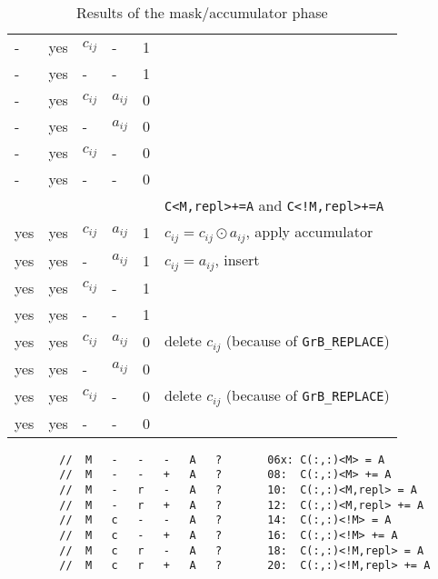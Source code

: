 \documentclass[12pt]{article}
\begin{document}
\begin{table}
{\begin{tabular}{lllll|l}
    -  &yes & $c_{ij}$ &  -        & 1    &   \\
    -  &yes &  -       &  -        & 1    &   \\
\hline
    -  &yes & $c_{ij}$ & $a_{ij}$  & 0    &   \\
    -  &yes &  -       & $a_{ij}$  & 0    &   \\
    -  &yes & $c_{ij}$ &  -        & 0    &   \\
    -  &yes &  -       &  -        & 0    &   \\
\hline
\hline
       &    &          &           &      & \verb'C<M,repl>+=A' and \verb'C<!M,repl>+=A' \\
\hline
    yes&yes & $c_{ij}$ & $a_{ij}$  & 1    &  $c_{ij} = c_{ij} \odot a_{ij}$, apply accumulator \\
    yes&yes &  -       & $a_{ij}$  & 1    &  $c_{ij} = a_{ij}$, insert \\
    yes&yes & $c_{ij}$ &  -        & 1    &   \\
    yes&yes &  -       &  -        & 1    &   \\
\hline

\hline
    yes&yes & $c_{ij}$ & $a_{ij}$  & 0    &  delete $c_{ij}$  (because of \verb'GrB_REPLACE') \\
    yes&yes &  -       & $a_{ij}$  & 0    &   \\
    yes&yes & $c_{ij}$ &  -        & 0    &  delete $c_{ij}$  (because of \verb'GrB_REPLACE') \\
    yes&yes &  -       &  -        & 0    &   \\
\hline
\end{tabular}
}
\caption{Results of the mask/accumulator phase \label{tab:maskaccum}}
\end{table}

\newpage

\begin{verbatim}
        //  M   -   -   -   A   ?       06x: C(:,:)<M> = A
        //  M   -   -   +   A   ?       08:  C(:,:)<M> += A
        //  M   -   r   -   A   ?       10:  C(:,:)<M,repl> = A
        //  M   -   r   +   A   ?       12:  C(:,:)<M,repl> += A
        //  M   c   -   -   A   ?       14:  C(:,:)<!M> = A
        //  M   c   -   +   A   ?       16:  C(:,:)<!M> += A
        //  M   c   r   -   A   ?       18:  C(:,:)<!M,repl> = A
        //  M   c   r   +   A   ?       20:  C(:,:)<!M,repl> += A
\end{verbatim}
\end{document}
